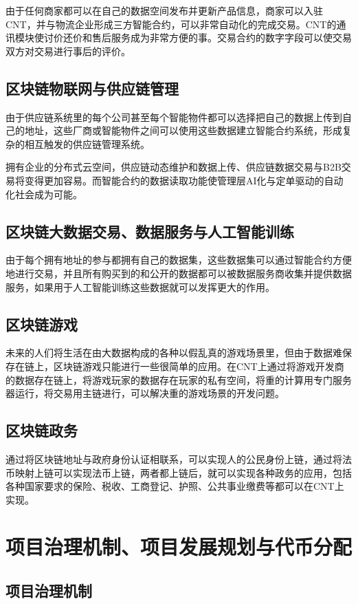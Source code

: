 \documentclass[a4paper,12pt]{article}
\begin{document}
由于任何商家都可以在自己的数据空间发布并更新产品信息，商家可以入驻CNT，并与物流企业形成三方智能合约，可以非常自动化的完成交易。CNT的通讯模块使讨价还价和售后服务成为非常方便的事。交易合约的数字字段可以使交易双方对交易进行事后的评价。

\subsection{区块链物联网与供应链管理}
由于供应链系统里的每个公司甚至每个智能物件都可以选择把自己的数据上传到自己的地址，这些厂商或智能物件之间可以使用这些数据建立智能合约系统，形成复杂的相互触发的供应链管理系统。

拥有企业的分布式云空间，供应链动态维护和数据上传、供应链数据交易与B2B交易将变得更加容易。而智能合约的数据读取功能使管理层AI化与定单驱动的自动化社会成为可能。

\subsection{区块链大数据交易、数据服务与人工智能训练}

由于每个拥有地址的参与都拥有自己的数据集，这些数据集可以通过智能合约方便地进行交易，并且所有购买到的和公开的数据都可以被数据服务商收集并提供数据服务，如果用于人工智能训练这些数据就可以发挥更大的作用。

\subsection{区块链游戏}
未来的人们将生活在由大数据构成的各种以假乱真的游戏场景里，但由于数据难保存在链上，区块链游戏只能进行一些很简单的应用。在CNT上通过将游戏开发商的数据存在链上，将游戏玩家的数据存在玩家的私有空间，将重的计算用专门服务器运行，将交易用主链进行，可以解决重的游戏场景的开发问题。

\subsection{区块链政务}
通过将区块链地址与政府身份认证相联系，可以实现人的公民身份上链，通过将法币映射上链可以实现法币上链，两者都上链后，就可以实现各种政务的应用，包括各种国家要求的保险、税收、工商登记、护照、公共事业缴费等都可以在CNT上实现。


\section{项目治理机制、项目发展规划与代币分配}

\subsection{项目治理机制}
\end{document}
